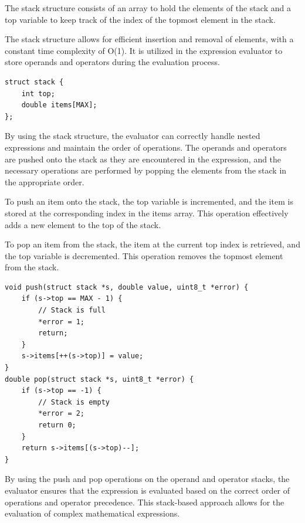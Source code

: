 \documentclass[a4paper, twoside]{report}
\begin{document}
The stack structure consists of an array to hold the elements of the stack and a top variable to keep track of the index of the topmost element in the stack.

The stack structure allows for efficient insertion and removal of elements, with a constant time complexity of O(1). It is utilized in the expression evaluator to store operands and operators during the evaluation process.

\begin{verbatim}
struct stack {
	int top;
	double items[MAX];
};
\end{verbatim}

By using the stack structure, the evaluator can correctly handle nested expressions and maintain the order of operations. The operands and operators are pushed onto the stack as they are encountered in the expression, and the necessary operations are performed by popping the elements from the stack in the appropriate order.

To push an item onto the stack, the top variable is incremented, and the item is stored at the corresponding index in the items array. This operation effectively adds a new element to the top of the stack.

To pop an item from the stack, the item at the current top index is retrieved, and the top variable is decremented. This operation removes the topmost element from the stack.

\begin{verbatim}
void push(struct stack *s, double value, uint8_t *error) {
    if (s->top == MAX - 1) {
        // Stack is full
        *error = 1;
        return;
    }
    s->items[++(s->top)] = value;
}
double pop(struct stack *s, uint8_t *error) {
    if (s->top == -1) {
        // Stack is empty
        *error = 2;
        return 0;
    }
    return s->items[(s->top)--];
}
\end{verbatim}

By using the push and pop operations on the operand and operator stacks, the evaluator ensures that the expression is evaluated based on the correct order of operations and operator precedence. This stack-based approach allows for the evaluation of complex mathematical expressions.
\end{document}
